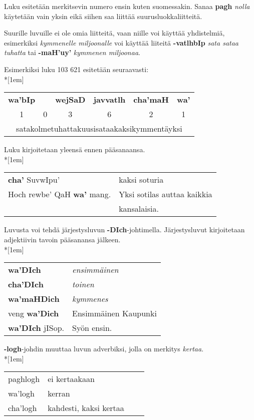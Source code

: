 \documentclass{book}
\begin{document}
Luku esitetään merkitsevin numero ensin kuten suomessakin.
Sanaa \textbf{pagh} \textit{nolla} käytetään vain yksin eikä siihen saa liittää suurusluokkaliitteitä.

Suurille luvuille ei ole omia liitteitä, vaan niille voi käyttää yhdistelmiä, esimerkiksi \textit{kymmenelle miljoonalle} voi käyttää liiteitä \textbf{-vatlhbIp} \textit{sata sataa tuhatta} tai \textbf{-maH'uy'} \textit{kymmenen miljoonaa}.

Esimerkiksi luku 103 621 esitetään seuraavasti:\\*[1em]
\begin{tabular}{c c c c c c}
    \textbf{wa'bIp} & & \textbf{wejSaD} & \textbf{javvatlh} & \textbf{cha'maH} & \textbf{wa'} \\
    1 & 0 & 3 & 6 & 2 & 1 \\
    \multicolumn{6}{c}{satakolmetuhattakuusisataakaksikymmentäyksi} \\
\end{tabular}

Luku kirjoitetaan yleensä ennen pääsanaansa.\\*[1em]
\begin{tabular}{l l}
    \textbf{cha'} SuvwIpu' & kaksi soturia \\
    Hoch rewbe' QaH \textbf{wa'} mang. & Yksi sotilas auttaa kaikkia \\
    & kansalaisia. \\
\end{tabular}

Luvusta voi tehdä järjestysluvun \textbf{-DIch}-johtimella.
Järjestysluvut kirjoitetaan adjektiivin tavoin pääsanansa jälkeen.
\\*[1em]
\begin{tabular}{l l}
    \textbf{wa'DIch} & \textit{ensimmäinen} \\
    \textbf{cha'DIch} & \textit{toinen} \\
    \textbf{wa'maHDich} & \textit{kymmenes} \\
    veng \textbf{wa'Dich} & Ensimmäinen Kaupunki \\
    \textbf{wa'DIch} jISop. & Syön ensin. \\
\end{tabular}

\textbf{-logh}-johdin muuttaa luvun adverbiksi, jolla on merkitys \textit{kertaa}.
\\*[1em]
\begin{tabular}{Bl Il}
    paghlogh & ei kertaakaan \\
    wa'logh & kerran \\
    cha'logh & kahdesti, kaksi kertaa \\
\end{tabular}
\end{document}
